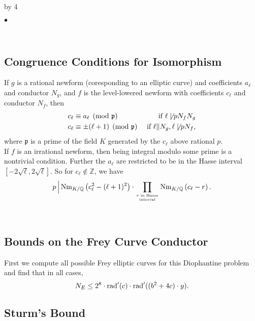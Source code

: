 \documentclass[12pt]{scrartcl}
\newenvironment{citemize}{
\begin{list}{$\bullet$}{\setlength{\itemsep}{0pt} \setlength{\rightmargin}{0pt} \setlength{\leftmargin}{0.5\labelwidth} \setlength{\topsep}{0pt}}
}{\end{list}}
\def\Q{{\mathbb Q}}
\def\Z{{\mathbb Z}}
\newcommand{\rad}{{\rm{rad}}}
\newcommand{\p}{\mathfrak{p}}
\newcommand{\Nm}{\operatorname{Nm}}
\def\anzspalten{4}
\newlength{\kastenwidth}
\newenvironment{kasten}{%
  \begin{lrbox}{\dummybox}%
    \begin{minipage}{0.96\linewidth}}%
    {\end{minipage}%
  \end{lrbox}%
  \raisebox{-\depth}{\psshadowbox[framesep=1em]{\usebox{\dummybox}}}\\[0.5em]}
\newenvironment{spalte}{%
  \setlength\kastenwidth{1.2\textwidth}
  \divide\kastenwidth by \anzspalten
  \begin{minipage}[t]{\kastenwidth}}{\end{minipage}\hfill}
\begin{document}
\begin{lrbox}{\spalten}
{\begin{spalte}
\begin{kasten}
\begin{citemize}
\end{citemize}

\end{kasten}

\begin{kasten}

\subsection*{ \color{blue} Congruence Conditions for Isomorphism}

If $g$ is a rational newform (coresponding to an elliptic curve) and coefficients $a_\ell$ and conductor $N_g$, and $f$ is the level-lowered newform with coefficients $c_\ell$ and conductor $N_f$, then
\begin{align*}
c_\ell &\equiv a_\ell \pmod{\p} & \text{ if $\ell \not\mid pN_fN_g$} \\
c_\ell &\equiv \pm(\ell+1) \pmod{\p} & \text{ if $\ell \| N_g, \ell \not\mid pN_f$},
\end{align*}
where $\p$ is a prime of the field $K$ generated by the $c_\ell$ above rational $p$. \\

If $f$ is an irrational newform, then being integral modulo some prime is a nontrivial condition.  Further the $a_\ell$ are restricted to be in the Hasse interval $[-2\sqrt{\ell}, 2\sqrt{\ell}]$.  So for $c_\ell \not\in \Z$, we have
\[ p\, \Big| \Nm_{K/\Q}\left(c_\ell^2 - (\ell+1)^2\right) \cdot \prod_{r \text{ in Hasse} \atop \text{interval}} \Nm_{K/\Q} \left( c_\ell - r \right). \]


\end{kasten}

\begin{kasten}

\subsection*{\color{blue} Bounds on the Frey Curve Conductor}

First we compute all possible Frey elliptic curves for this Diophantine problem and find that in all cases,
\[N_E \leq 2^8 \cdot \rad'(c) \cdot \rad'((b^2+4c)\cdot y).\]


\subsection*{\color{blue} Sturm's Bound}


\end{kasten}
\end{spalte}}
\end{lrbox}
\end{document}
